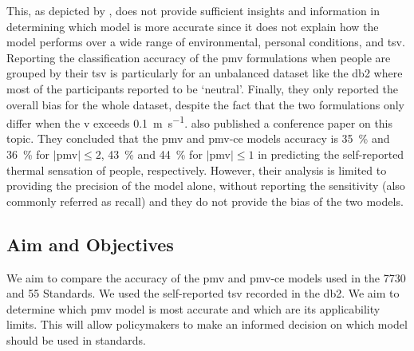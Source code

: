 This, as depicted by , does not provide sufficient insights and information in determining which model is more accurate since it does not explain how the model performs over a wide range of environmental, personal conditions, and \ac{tsv}.
Reporting the classification accuracy of the \ac{pmv} formulations when people are grouped by their \ac{tsv} is particularly for an unbalanced dataset like the \ac{db2} where most of the participants reported to be `neutral'.
Finally, they only reported the overall bias for the whole dataset, despite the fact that the two formulations only differ when the \ac{v} exceeds \qty{0.1}{\m\per\s}.
 also published a conference paper on this topic.
They concluded that the \ac{pmv} and \ac{pmv-ce} models accuracy is \qty{35}{\percent} and \qty{36}{\percent} for $\mid$\ac{pmv}$\mid \leq 2$, \qty{43}{\percent} and \qty{44}{\percent} for $\mid$\ac{pmv}$\mid \leq 1$ in predicting the self-reported thermal sensation of people, respectively.
However, their analysis is limited to providing the precision of the model alone, without reporting the sensitivity (also commonly referred as recall) and they do not provide the bias of the two models.

\subsection{Aim and Objectives}\label{subsec:aim-and-objectives}
We aim to compare the accuracy of the \ac{pmv} and \ac{pmv-ce} models used in the \gls{7730} and \gls{55} Standards.
We used the self-reported \ac{tsv} recorded in the \ac{db2}.
We aim to determine which \ac{pmv} model is most accurate and which are its applicability limits.
This will allow policymakers to make an informed decision on which model should be used in standards.